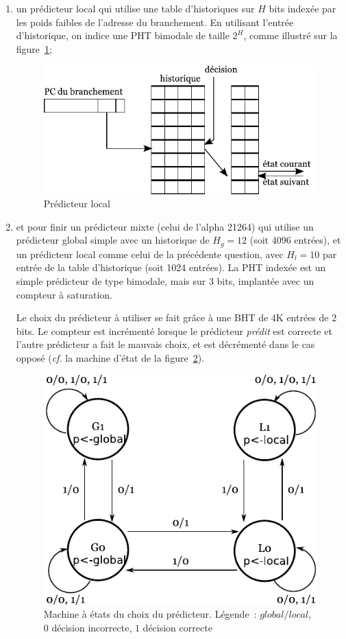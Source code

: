 \documentclass[a4paper]{article}
\begin{document}
\begin{enumerate}
\item un prédicteur local qui utilise une table d'historiques sur $H$ bits indexée par les poids faibles de l'adresse du branchement.  En utilisant l'entrée d'historique, on indice une PHT bimodale de taille $2^H$, comme illustré sur la figure~\ref{local};
      \begin{figure}[hbt]\center\leavevmode
      \includegraphics[scale=.9]{local}
      \caption{Prédicteur local}
      \label{local}
      \end{figure}

\item et pour finir un prédicteur mixte (celui de l'alpha 21264) qui utilise un prédicteur global simple avec un historique de $H_g=12$ (soit 4096 entrées), et un prédicteur local comme celui de la précédente question, avec $H_l=10$ par entrée de la table d'historique (soit 1024 entrées).
      La PHT indexée est un simple prédicteur de type bimodale, mais sur 3 bits, implantée avec un compteur à saturation.

      Le choix du prédicteur à utiliser se fait grâce à une BHT de 4K entrées de 2 bits.
      Le compteur est incrémenté lorsque le prédicteur \emph{prédit} est correcte et l'autre prédicteur a fait le mauvais choix, et est décrémenté dans le cas opposé (\emph{cf.} la machine d'état de la figure~\ref{mixte-graphe}).
      \begin{figure}[hbt]\center\leavevmode
      \includegraphics[scale=0.7]{mixte-graphe}
      \caption{Machine à états du choix du prédicteur.
      Légende~: $global/local$, $0$ décision incorrecte, $1$ décision correcte}
      \label{mixte-graphe}
      \end{figure}


\end{enumerate}
\end{document}
